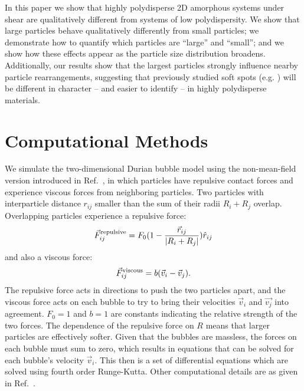 \documentclass[%
 reprint,
 amsmath,amssymb,
 aps,
]{revtex4-2}
\begin{document}
In this paper we show that highly polydisperse 2D amorphous systems under shear are qualitatively different from systems of low polydispersity. We show that large particles behave qualitatively differently from small particles; we demonstrate how to quantify which particles are ``large'' and ``small''; and we show how these effects appear as the particle size distribution broadens.  Additionally, our results show that the largest particles strongly influence nearby particle rearrangements, suggesting that previously studied soft spots (e.g. \cite{manning11,cubuk15,schoenholz16,bapst2020unveiling,boattini2021averaging}) will be different in character -- and easier to identify -- in highly polydisperse materials.

\section{Computational Methods}

We simulate the two-dimensional Durian bubble model \cite{durian95} using the non-mean-field version introduced in Ref.~\cite{tewari99}, in which particles have repulsive contact forces and experience viscous forces from neighboring particles.  Two particles with interparticle distance $r_{ij}$ smaller than the sum of their radii $R_i+R_j$ overlap.  Overlapping particles experience a repulsive force:
\begin{equation}
    \label{equation_1}
    \Vec{F}_{ij}^{\rm repulsive}=F_0 (1-\frac{\vec{r}_{ij}}{|R_i+R_j|})\hat{r}_{ij}
\end{equation}
and also a viscous force:
\begin{equation}
    \label{equation_2}
    \Vec{F}_{ij}^{\rm viscous}=b(\Vec{v}_i-\Vec{v}_j).
\end{equation}
The repulsive force acts in directions to push the two particles apart, and the viscous force acts on each bubble to try to bring their velocities $\vec{v}_i$ and $\vec{v_j}$ into agreement.  $F_0=1$ and $b=1$ are constants indicating the relative strength of the two forces.  The dependence of the repulsive force on $R$ means that larger particles are effectively softer.  Given that the bubbles are massless, the forces on each bubble must sum to zero, which results in equations that can be solved for each bubble's velocity $\vec{v}_i$.  This then is a set of differential equations which are solved using fourth order Runge-Kutta.  Other computational details are as given in Ref.~\cite{hong17}.
\end{document}
